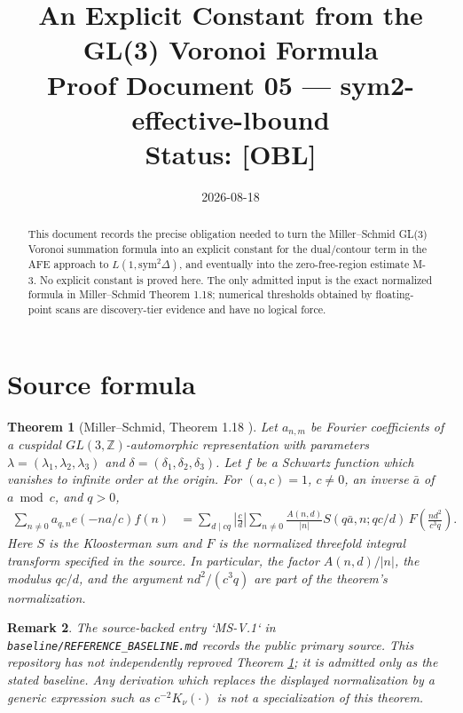 \documentclass[12pt]{article}
\title{An Explicit Constant from the GL(3) Voronoi Formula\\
\large Proof Document 05 --- sym2-effective-lbound\\
\normalsize \textbf{Status: [OBL]}}
\author{}
\date{2026-08-18}
\newtheorem{theorem}{Theorem}[section]
\newtheorem{remark}[theorem]{Remark}
\newcommand{\Z}{\mathbb{Z}}
\begin{document}
\maketitle

\begin{abstract}
This document records the precise obligation needed to turn the Miller--Schmid
GL(3) Voronoi summation formula into an explicit constant for the dual/contour
term in the AFE approach to \(L(1,\mathrm{sym}^2\Delta)\), and eventually into
the zero-free-region estimate M-3.  No explicit constant is proved here.  The
only admitted input is the exact normalized formula in Miller--Schmid Theorem
1.18; numerical thresholds obtained by floating-point scans are discovery-tier
evidence and have no logical force.
\end{abstract}

\section{Source formula}

\begin{theorem}[Miller--Schmid, Theorem 1.18 {\normalfont [BASE]}]
\label{thm:ms-voronoi}
Let \(a_{n,m}\) be Fourier coefficients of a cuspidal \(GL(3,\Z)\)-automorphic
representation with parameters \(\lambda=(\lambda_1,\lambda_2,\lambda_3)\) and
\(\delta=(\delta_1,\delta_2,\delta_3)\).  Let \(f\) be a Schwartz function which
vanishes to infinite order at the origin.  For \((a,c)=1\), \(c\neq0\), an inverse
\(\bar a\) of \(a\bmod c\), and \(q>0\),
\begin{align*}
  \sum_{n\neq0} a_{q,n} e(-na/c) f(n)
  &= \sum_{d\mid cq} \left|\frac{c}{d}\right|
       \sum_{n\neq0} \frac{A(n,d)}{|n|}
       S(q\bar a,n;qc/d)\,
       F\!\left(\frac{nd^2}{c^3q}\right).
\end{align*}
Here \(S\) is the Kloosterman sum and \(F\) is the normalized threefold
integral transform specified in the source.  In particular, the factor
\(A(n,d)/|n|\), the modulus \(qc/d\), and the argument
\(nd^2/(c^3q)\) are part of the theorem's normalization.
\end{theorem}

\begin{remark}
The source-backed entry `MS-V.1` in
\texttt{baseline/REFERENCE\_BASELINE.md} records the public primary source.
This repository has not independently reproved Theorem
\ref{thm:ms-voronoi}; it is admitted only as the stated baseline.  Any derivation
which replaces the displayed normalization by a generic expression such as
\(c^{-2}K_\nu(\cdot)\) is not a specialization of this theorem.
\end{remark}
\end{document}
